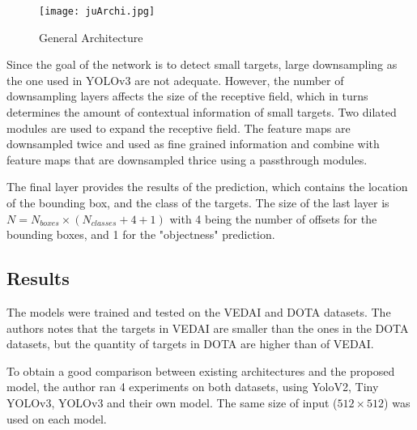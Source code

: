 \begin{figure}[h!]
	\centering
	\texttt{[image: juArchi.jpg]}
	\caption[General Architecture for the Simple and Efficient Network for Small Target Detection]{General Architecture}
	\label{fig:juGeneralArchi}
\end{figure}

Since the goal of the network is to detect small targets, large downsampling as the one used in YOLOv3 are not adequate. However, the number of downsampling layers affects the size of the receptive field, which in turns determines the amount of contextual information of small targets. Two dilated modules are used to expand the receptive field. The feature maps are downsampled twice and used as fine grained information and combine with feature maps that are downsampled thrice using a passthrough modules. 

The final layer provides the results of the prediction, which contains the location of the bounding box, and the class of the targets. The size of the last layer is $N = N_{boxes} \times (N_{classes} + 4 + 1)$ with 4 being the number of offsets for the bounding boxes, and 1 for the  "objectness" prediction. 

\subsection{Results}
The models were trained and tested on the VEDAI\cite{vedai} and DOTA datasets\cite{dota}. The authors notes that the targets in VEDAI are smaller than the ones in the DOTA datasets, but the quantity of targets in DOTA are higher than of VEDAI.

To obtain a good comparison between existing architectures and the proposed model, the author ran 4 experiments on both datasets, using YoloV2, Tiny YOLOv3, YOLOv3 and their own model. The same size of input ($512 \times 512$) was used on each model.

